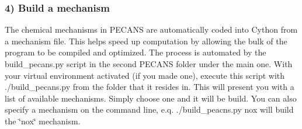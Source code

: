 \subsubsection*{4) Build a mechanism}

The chemical mechanisms in P\+E\+C\+A\+NS are automatically coded into Cython from a mechanism file. This helps speed up computation by allowing the bulk of the program to be compiled and optimized. The process is automated by the {\ttfamily build\+\_\+pecans.\+py} script in the second P\+E\+C\+A\+NS folder under the main one. With your virtual environment activated (if you made one), execute this script with {\ttfamily ./build\+\_\+pecans.py} from the folder that it resides in. This will present you with a list of available mechanisms. Simply choose one and it will be build. You can also specify a mechanism on the command line, e.\+q. {\ttfamily ./build\+\_\+peacns.py nox} will build the \char`\"{}nox\char`\"{} mechanism. 